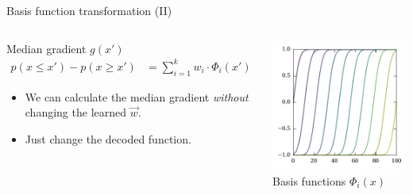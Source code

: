 \documentclass[aspectratio=169]{beamer}
\begin{document}
\begin{frame}{Basis function transformation (II)}
\begin{columns}[T]
	\begin{overlayarea}{\textwidth}{6cm}
	\begin{block}{Median gradient $g(x')$}
	\begin{align*}
		p(x \leq x') - p(x \geq x')
			&= \sum_{i = 1}^k w_i \cdot \Phi_i(x')
	\end{align*}
	\begin{itemize}
		\item<2->[$\Rightarrow$] We can calculate the median gradient \emph{without} changing the learned $\vec w$.
		\item<3->[$\Rightarrow$] Just change the decoded function.
	\end{itemize}
	\end{block}
	\end{overlayarea}
	\centering
	\includegraphics[width=\textwidth]{media/basis_gaussian_median.pdf}\\
	\footnotesize Basis functions $\Phi_i(x)$
\end{columns}
\end{frame}
\end{document}
